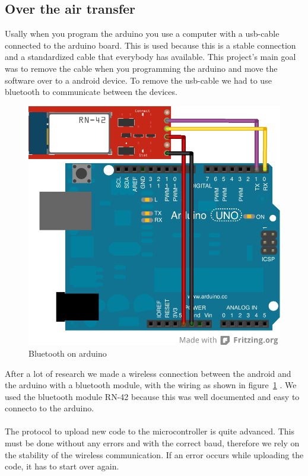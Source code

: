 \subsection{Over the air transfer}
Usally when you program the arduino you use a computer with a usb-cable connected to the arduino board. This is used because this is a stable connection and a standardized cable that everybody has available. This project's main goal was to remove the cable when you programming the arduino and move the software over to a android device. To remove the usb-cable we had to use bluetooth to communicate between the devices.
\\
\begin{figure}[H]
\includegraphics[scale=1.2]{images/wiring_simple.png}
\caption{Bluetooth on arduino}
\label{fig:SimpleArduinoWiring}
\end{figure}

After a lot of research we made a wireless connection between the android and the arduino with a bluetooth module, with the wiring as shown in figure~\ref{fig:SimpleArduinoWiring} . We used the bluetooth module RN-42 because this was well documented and easy to connecto to the arduino.\\
\\
The protocol to upload new code to the microcontroller is quite advanced. This must be done without any errors and with the correct baud, therefore we rely on the stability of the wireless communication. If an error occurs while uploading the code, it has to start over again.
